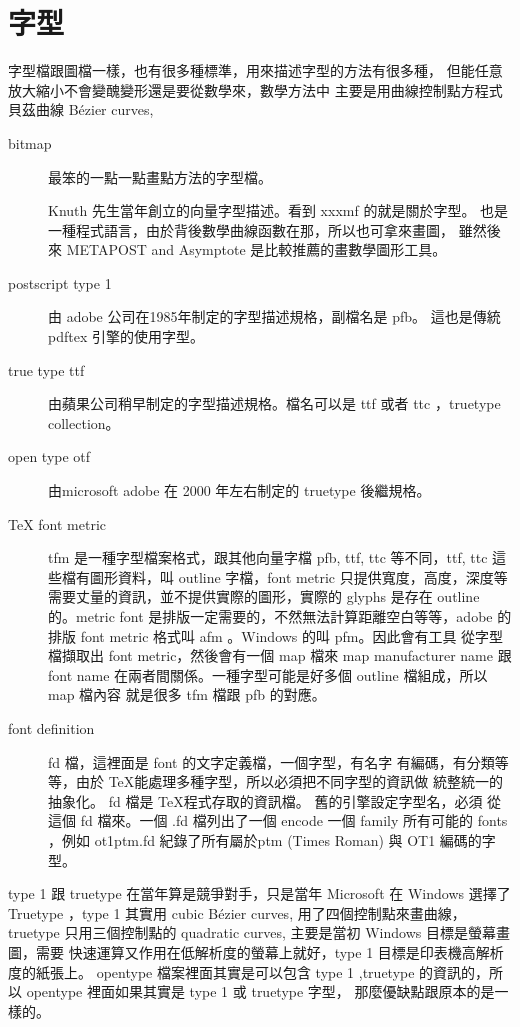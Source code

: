 \section{字型}
字型檔跟圖檔一樣，也有很多種標準，用來描述字型的方法有很多種，
但能任意放大縮小不會變醜變形還是要從數學來，數學方法中
主要是用曲線控制點方程式貝茲曲線 Bézier curves,
\begin{description}
\item [bitmap] 最笨的一點一點畫點方法的字型檔。
\item [\MF{}] Knuth 先生當年創立的向量字型描述。看到 xxxmf 的就是關於字型。
\MF{} 也是一種程式語言，由於背後數學曲線函數在那，所以也可拿來畫圖，
雖然後來 METAPOST and Asymptote 是比較推薦的畫數學圖形工具。
\item [postscript type 1] 由 adobe 公司在1985年制定的字型描述規格，副檔名是 pfb。
  這也是傳統 pdftex 引擎的使用字型。
\item [true type ttf] 由蘋果公司稍早制定的字型描述規格。檔名可以是 ttf 或者 ttc
，truetype collection。
\item [open type otf] 由microsoft adobe 在 2000 年左右制定的 truetype 後繼規格。
\item [TeX font metric] tfm 是一種字型檔案格式，跟其他向量字檔 pfb, ttf, ttc
等不同，ttf, ttc 這些檔有圖形資料，叫 outline 字檔，font metric
只提供寬度，高度，深度等需要丈量的資訊，並不提供實際的圖形，實際的 glyphs
是存在 outline 的。metric font 是排版一定需要的，不然無法計算距離空白等等，adobe
的排版 font metric 格式叫 afm 。Windows 的叫 pfm。因此會有工具
從字型檔擷取出 font metric，然後會有一個 map 檔來 map manufacturer name 跟
font name 在兩者間關係。一種字型可能是好多個 outline 檔組成，所以 map 檔內容
就是很多 tfm 檔跟 pfb 的對應。
\item [font definition] fd 檔，這裡面是 font 的文字定義檔，一個字型，有名字
有編碼，有分類等等，由於 \TeX 能處理多種字型，所以必須把不同字型的資訊做
統整統一的抽象化。 fd 檔是 \TeX 程式存取的資訊檔。 舊的引擎設定字型名，必須
從這個 fd 檔來。一個 .fd 檔列出了一個 encode 一個 family 所有可能的 fonts
，例如 ot1ptm.fd 紀錄了所有屬於ptm (Times Roman) 與 OT1 編碼的字型。
\end{description}
type 1 跟 truetype 在當年算是競爭對手，只是當年 Microsoft 在 Windows 選擇了
Truetype ，type 1 其實用 cubic Bézier curves, 用了四個控制點來畫曲線，truetype
只用三個控制點的 quadratic curves, 主要是當初 Windows 目標是螢幕畫圖，需要
快速運算又作用在低解析度的螢幕上就好，type 1 目標是印表機高解析度的紙張上。
opentype 檔案裡面其實是可以包含 type 1 ,truetype 的資訊的，所以 opentype
裡面如果其實是 type 1 或 truetype 字型， 那麼優缺點跟原本的是一樣的。
